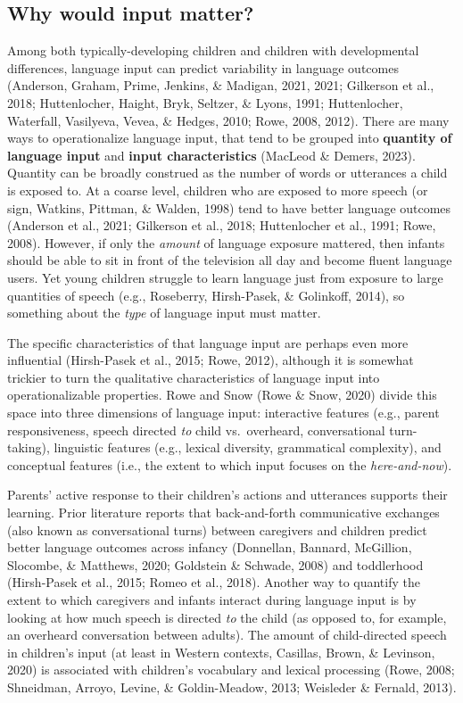 \documentclass[
  man]{apa6}
\begin{document}
\hypertarget{why-would-input-matter}{%
\subsection{Why would input matter?}\label{why-would-input-matter}}

Among both typically-developing children and children with developmental differences, language input can predict variability in language outcomes (Anderson, Graham, Prime, Jenkins, \& Madigan, 2021, 2021; Gilkerson et al., 2018; Huttenlocher, Haight, Bryk, Seltzer, \& Lyons, 1991; Huttenlocher, Waterfall, Vasilyeva, Vevea, \& Hedges, 2010; Rowe, 2008, 2012). There are many ways to operationalize language input, that tend to be grouped into \textbf{quantity of language input} and \textbf{input characteristics} (MacLeod \& Demers, 2023). Quantity can be broadly construed as the number of words or utterances a child is exposed to. At a coarse level, children who are exposed to more speech (or sign, Watkins, Pittman, \& Walden, 1998) tend to have better language outcomes (Anderson et al., 2021; Gilkerson et al., 2018; Huttenlocher et al., 1991; Rowe, 2008). However, if only the \emph{amount} of language exposure mattered, then infants should be able to sit in front of the television all day and become fluent language users. Yet young children struggle to learn language just from exposure to large quantities of speech (e.g., Roseberry, Hirsh-Pasek, \& Golinkoff, 2014), so something about the \emph{type} of language input must matter.

The specific characteristics of that language input are perhaps even more influential (Hirsh-Pasek et al., 2015; Rowe, 2012), although it is somewhat trickier to turn the qualitative characteristics of language input into operationalizable properties. Rowe and Snow (Rowe \& Snow, 2020) divide this space into three dimensions of language input: interactive features (e.g., parent responsiveness, speech directed \emph{to} child vs.~overheard, conversational turn-taking), linguistic features (e.g., lexical diversity, grammatical complexity), and conceptual features (i.e., the extent to which input focuses on the \emph{here-and-now}).

Parents' active response to their children's actions and utterances supports their learning. Prior literature reports that back-and-forth communicative exchanges (also known as conversational turns) between caregivers and children predict better language outcomes across infancy (Donnellan, Bannard, McGillion, Slocombe, \& Matthews, 2020; Goldstein \& Schwade, 2008) and toddlerhood (Hirsh-Pasek et al., 2015; Romeo et al., 2018). Another way to quantify the extent to which caregivers and infants interact during language input is by looking at how much speech is directed \emph{to} the child (as opposed to, for example, an overheard conversation between adults). The amount of child-directed speech in children's input (at least in Western contexts, Casillas, Brown, \& Levinson, 2020) is associated with children's vocabulary and lexical processing (Rowe, 2008; Shneidman, Arroyo, Levine, \& Goldin-Meadow, 2013; Weisleder \& Fernald, 2013).
\end{document}
